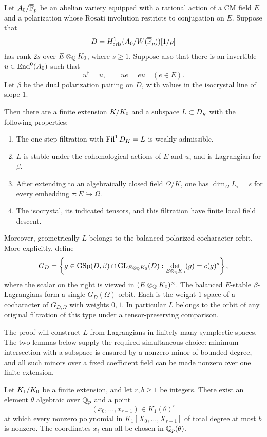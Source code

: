 \begin{theorem}
\label{thm:filtration}
Let $A_0/\overline{\mathbb F}_p$ be an abelian variety equipped with a rational
action of a CM field $E$ and a polarization whose Rosati involution
restricts to conjugation on $E$.  Suppose that
\[
 D=H^1_{\mathrm{cris}}(A_0/W(\overline{\mathbb F}_p))[1/p]
\]
has rank $2s$ over $E\otimes_\mathbb QK_0$, where $s\geq 1$.  Suppose also
that there is an invertible $u\in\operatorname{End}^0(A_0)$ such that
\[
 u^\dagger=u,\qquad ue=\bar e u\quad(e\in E).
\]
Let $\beta$ be the dual polarization pairing on $D$, with values in
the isocrystal line of slope $1$.

Then there are a finite extension $K/K_0$ and a subspace $L\subset
D_K$ with the following properties:
\begin{enumerate}
\item The one-step filtration with $\operatorname{Fil}^1D_K=L$ is weakly admissible.
\item $L$ is stable under the cohomological actions of $E$ and $u$,
and is Lagrangian for $\beta$.
\item After extending to an algebraically closed field $\Omega/K$,
one has $\dim_\Omega L_\tau=s$ for every embedding
$\tau:E\hookrightarrow\Omega$.
\item The isocrystal, its indicated tensors, and this filtration have
finite local field descent.
\end{enumerate}
Moreover, geometrically $L$ belongs to the balanced polarized
cocharacter orbit.  More explicitly, define
\[
 G_D=\left\{g\in\operatorname{GSp}(D,\beta)\cap
 \operatorname{GL}_{E\otimes_\mathbb QK_0}(D):
 \det_{E\otimes_\mathbb QK_0}(g)=c(g)^s\right\},
\]
where the scalar on the right is viewed in
$(E\otimes_\mathbb QK_0)^\times$.  The balanced $E$-stable
$\beta$-Lagrangians form a single $G_D(\Omega)$-orbit.  Each is the
weight-$1$ space of a cocharacter of $G_{D,\Omega}$ with weights $0,1$.
In particular $L$ belongs to the orbit of any original filtration of
this type under a tensor-preserving comparison.
\end{theorem}

The proof will construct \(L\) from Lagrangians in finitely many
symplectic spaces. The two lemmas below supply the required simultaneous
choice: minimum intersection with a subspace is ensured by a nonzero
minor of bounded degree, and all such minors over a fixed coefficient
field can be made nonzero over one finite extension.

\begin{lemma}
\label{lem:avoidance}
Let $K_1/K_0$ be a finite extension, and let $r,b\geq 1$ be integers.
There exist an element $\theta$ algebraic over $\mathbb Q_p$ and a point
\[
 (x_0,\ldots,x_{r-1})\in K_1(\theta)^r
\]
at which every nonzero polynomial in $K_1[X_0,\ldots,X_{r-1}]$ of total
degree at most $b$ is nonzero.  The coordinates $x_i$ can all be chosen
in $\mathbb Q_p(\theta)$.
\end{lemma}


